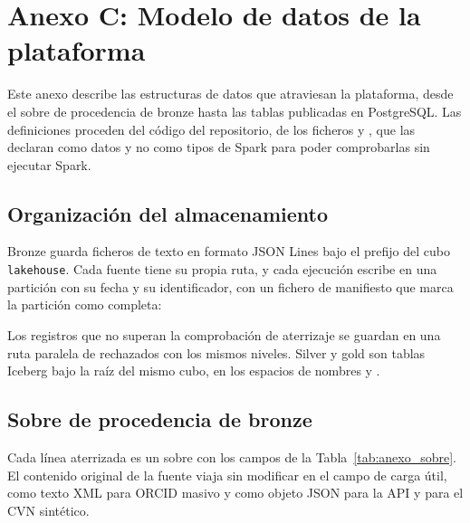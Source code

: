 \chapter*{Anexo C: Modelo de datos de la plataforma}
\label{cap:anexo_modelo}

\setcounter{section}{0}
\renewcommand{\thesection}{C.\arabic{section}}

Este anexo describe las estructuras de datos que atraviesan la plataforma,
desde el sobre de procedencia de bronze hasta las tablas publicadas en
PostgreSQL. Las definiciones proceden del código del repositorio, de los
ficheros  y
, que las declaran como datos y no
como tipos de Spark para poder comprobarlas sin ejecutar Spark.

\section{Organización del almacenamiento}
\label{sec:anexo_modelo_almacenamiento}

Bronze guarda ficheros de texto en formato JSON Lines bajo el prefijo
 del cubo \texttt{lakehouse}. Cada fuente tiene su propia
ruta, y cada ejecución escribe en una partición con su fecha y su
identificador, con un fichero de manifiesto que marca la partición como
completa:

\begin{center}
\small{}
\end{center}

Los registros que no superan la comprobación de aterrizaje se guardan en
una ruta paralela de rechazados con los mismos niveles. Silver y gold son
tablas Iceberg bajo la raíz  del mismo cubo, en los espacios
de nombres  y .

\section{Sobre de procedencia de bronze}
\label{sec:anexo_modelo_sobre}

Cada línea aterrizada es un sobre con los campos de la
Tabla~\ref{tab:anexo_sobre}. El contenido original de la fuente viaja sin
modificar en el campo de carga útil, como texto XML para ORCID masivo y como
objeto JSON para la API y para el CVN sintético.

